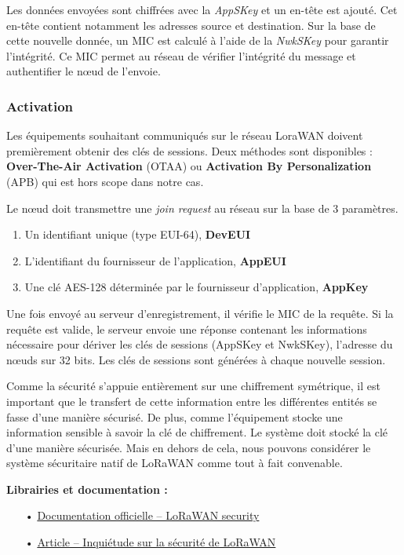 \documentclass[12pt]{article}
\begin{document}
Les données envoyées sont chiffrées avec la \emph{AppSKey} et un en-tête est ajouté. Cet en-tête contient notamment les adresses source et destination. Sur la base de cette nouvelle donnée, un MIC est calculé à l'aide de la \emph{NwkSKey}  pour garantir l'intégrité. Ce MIC permet au réseau de vérifier l'intégrité du message et authentifier le nœud de l'envoie.

\subsubsection{Activation}

Les équipements souhaitant communiqués sur le réseau LoraWAN doivent premièrement obtenir des clés de sessions. Deux méthodes sont disponibles : \textbf{Over-The-Air Activation} (OTAA) ou \textbf{Activation By Personalization} (APB) qui est hors scope dans notre cas.

Le nœud doit transmettre une \emph{join request} au réseau sur la base de 3 paramètres.
\begin{enumerate}
\item Un identifiant unique (type EUI-64), \textbf{DevEUI}
\item L'identifiant du fournisseur de l'application, \textbf{AppEUI}
\item Une clé AES-128 déterminée par le fournisseur d'application, \textbf{AppKey}
\end{enumerate}
\vspace{3mm}

Une fois envoyé au serveur d'enregistrement, il vérifie le MIC de la requête. Si la requête est valide, le serveur envoie une réponse contenant les informations nécessaire pour dériver les clés de sessions (AppSKey et NwkSKey), l'adresse du nœuds sur 32 bits. Les clés de sessions sont générées à chaque nouvelle session.

Comme la sécurité s'appuie entièrement sur une chiffrement symétrique, il est important que le transfert de cette information entre les différentes entités se fasse d'une manière sécurisé. De plus, comme l'équipement stocke une information sensible à savoir la clé de chiffrement. Le système doit stocké la clé d'une manière sécurisée. Mais en dehors de cela, nous pouvons considérer le système sécuritaire natif de LoRaWAN comme tout à fait convenable.

\medskip
\textbf{Librairies et documentation :}

\begin{itemize}
\item[•] \href{https://www.thethingsnetwork.org/docs/lorawan/security.html}{Documentation officielle -- LoRaWAN security}
\item[•] \href{http://simfonymobile.com/blog/Should-you-worry-about-LoRaWAN-security/}{Article -- Inquiétude sur la sécurité de LoRaWAN}
\end{itemize}
\end{document}
